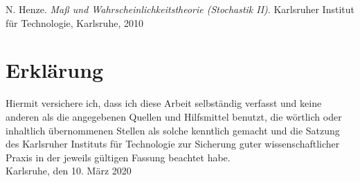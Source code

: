 \documentclass[12pt,a4paper]{scrartcl}
\numberwithin{equation}{section}
\numberwithin{equation}{section}%
\theoremstyle{definition}
\theoremstyle{definition}
\begin{document}
\begin{thebibliography}{Lam00}
\thispagestyle{empty}

N. Henze.
\emph{Maß und Wahrscheinlichkeitstheorie (Stochastik II)}.
Karlsruher Institut für Technologie, Karlsruhe, 2010

\end{thebibliography}

\newpage
  
\thispagestyle{empty}

\vspace*{8cm}


\section*{Erklärung}

Hiermit versichere ich, dass ich diese Arbeit selbständig verfasst und keine anderen als die angegebenen Quellen und Hilfsmittel benutzt, die wörtlich oder inhaltlich übernommenen Stellen als solche kenntlich gemacht und die Satzung des Karlsruher Instituts für Technologie zur Sicherung guter wissenschaftlicher Praxis in der jeweils gültigen Fassung beachtet habe. \\[2ex] 

\noindent
Karlsruhe, den 10. März 2020\\[5ex] 
\end{document}
